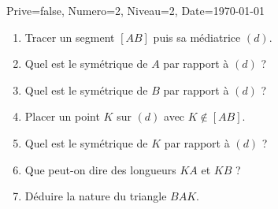 \documentclass[a4paper,12pt]{article}
\begin{document}
\begin{Maquette}[DM]{Prive=false, Numero=2, Niveau=2, Date=\today}
\begin{exercice}
\begin{enumerate}
\item Tracer un segment $[AB]$ puis sa médiatrice $(d)$.
\item Quel est le symétrique de $A$ par rapport à $(d)$ ?
\item Quel est le symétrique de $B$ par rapport à $(d)$ ?
\item Placer un point $K$ sur $(d)$ avec $K\notin [AB]$.
\item Quel est le symétrique de $K$ par rapport à $(d)$ ?
\item Que peut-on dire des longueurs $KA$ et $KB$ ?
\item Déduire la nature du triangle $BAK$.
\end{enumerate}
\end{exercice}
\end{Maquette}
\end{document}
